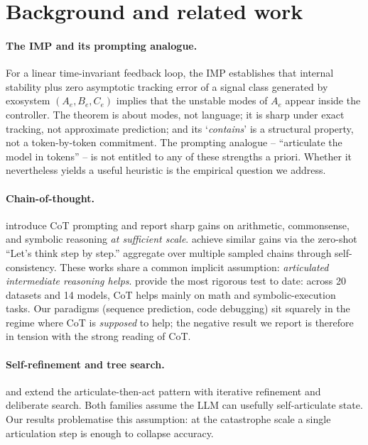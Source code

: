 \documentclass{article}
\begin{document}
\section{Background and related work}
\label{sec:bg}

\paragraph{The IMP and its prompting analogue.}
For a linear time-invariant feedback loop, the IMP
\citep{francis1976internal} establishes that internal stability
plus zero asymptotic tracking error of a signal class generated
by exosystem $(A_e, B_e, C_e)$ implies that the unstable modes of
$A_e$ appear inside the controller.  The theorem is about modes,
not language; it is sharp under exact tracking, not approximate
prediction; and its `\emph{contains}' is a structural property,
not a token-by-token commitment.  The prompting analogue --
``articulate the model in tokens'' -- is not entitled to any of
these strengths a priori.  Whether it nevertheless yields a
useful heuristic is the empirical question we address.

\paragraph{Chain-of-thought.}
\citet{wei2022chain} introduce CoT prompting and report sharp
gains on arithmetic, commonsense, and symbolic reasoning
\emph{at sufficient scale}.  \citet{kojima2022zero} achieve
similar gains via the zero-shot ``Let's think step by step.''
\citet{wang2023self} aggregate over multiple sampled chains
through self-consistency.  These works share a common implicit
assumption: \emph{articulated intermediate reasoning helps}.
\citet{sprague2024cot} provide the most rigorous test to date:
across 20 datasets and 14 models, CoT helps mainly on math and
symbolic-execution tasks.  Our paradigms (sequence prediction,
code debugging) sit squarely in the regime where CoT is
\emph{supposed} to help; the negative result we report is
therefore in tension with the strong reading of CoT.

\paragraph{Self-refinement and tree search.}
\citet{madaan2023self} and \citet{yao2023tree} extend the
articulate-then-act pattern with iterative refinement and
deliberate search.  Both families assume the LLM can usefully
self-articulate state.  Our results problematise this
assumption: at the catastrophe scale a single articulation step
is enough to collapse accuracy.
\end{document}
